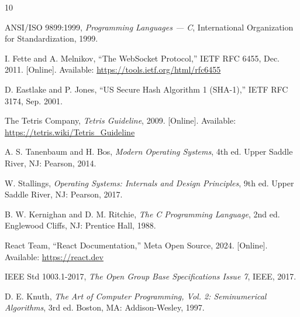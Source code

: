 \documentclass[conference]{IEEEtran}
\begin{document}
\begin{thebibliography}{10}

ANSI/ISO 9899:1999, \textit{Programming Languages --- C}, International Organization for Standardization, 1999.

I. Fette and A. Melnikov, ``The WebSocket Protocol,'' IETF RFC 6455, Dec. 2011. [Online]. Available: \url{https://tools.ietf.org/html/rfc6455}

D. Eastlake and P. Jones, ``US Secure Hash Algorithm 1 (SHA-1),'' IETF RFC 3174, Sep. 2001.

The Tetris Company, \textit{Tetris Guideline}, 2009. [Online]. Available: \url{https://tetris.wiki/Tetris_Guideline}

A. S. Tanenbaum and H. Bos, \textit{Modern Operating Systems}, 4th ed. Upper Saddle River, NJ: Pearson, 2014.

W. Stallings, \textit{Operating Systems: Internals and Design Principles}, 9th ed. Upper Saddle River, NJ: Pearson, 2017.

B. W. Kernighan and D. M. Ritchie, \textit{The C Programming Language}, 2nd ed. Englewood Cliffs, NJ: Prentice Hall, 1988.

React Team, ``React Documentation,'' Meta Open Source, 2024. [Online]. Available: \url{https://react.dev}

IEEE Std 1003.1-2017, \textit{The Open Group Base Specifications Issue 7}, IEEE, 2017.

D. E. Knuth, \textit{The Art of Computer Programming, Vol. 2: Seminumerical Algorithms}, 3rd ed. Boston, MA: Addison-Wesley, 1997.

\end{thebibliography}
\end{document}
